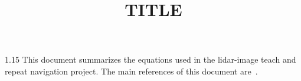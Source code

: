 \documentclass[11pt, letterpaper]{harvardml}
\title{TITLE} %
\begin{document}
\begin{spacing}{1.15}
This document summarizes the equations used in the lidar-image teach and repeat navigation project. The main references of this document are~\cite{barfoot2024state,anderson2013ransac,tong2014pose, anderson2015relative}.
\addtocounter{section}{0}



% 
\end{spacing}
\clearpage



\end{document}
